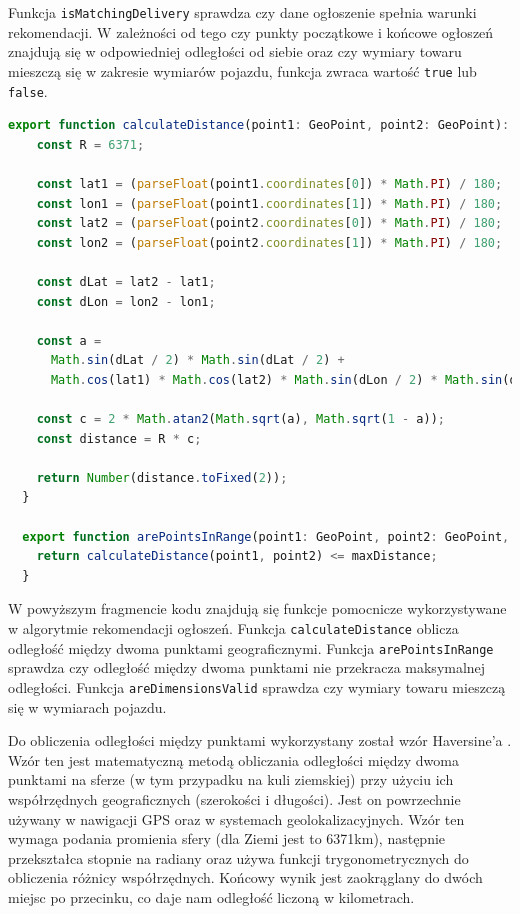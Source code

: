 Funkcja \texttt{isMatchingDelivery} sprawdza czy dane ogłoszenie spełnia warunki rekomendacji. W zależności od tego czy punkty początkowe i końcowe ogłoszeń znajdują się w odpowiedniej odległości od siebie oraz czy wymiary towaru mieszczą się w zakresie wymiarów pojazdu, funkcja zwraca wartość \texttt{true} lub \texttt{false}.

{\belowcaptionskip=-9pt
\begin{lstlisting}[language=JavaScript,caption=Funkcje obliczająca odległość między punktami, label=lst:calculateDistance]
  export function calculateDistance(point1: GeoPoint, point2: GeoPoint): number {
    const R = 6371;

    const lat1 = (parseFloat(point1.coordinates[0]) * Math.PI) / 180;
    const lon1 = (parseFloat(point1.coordinates[1]) * Math.PI) / 180;
    const lat2 = (parseFloat(point2.coordinates[0]) * Math.PI) / 180;
    const lon2 = (parseFloat(point2.coordinates[1]) * Math.PI) / 180;

    const dLat = lat2 - lat1;
    const dLon = lon2 - lon1;

    const a =
      Math.sin(dLat / 2) * Math.sin(dLat / 2) +
      Math.cos(lat1) * Math.cos(lat2) * Math.sin(dLon / 2) * Math.sin(dLon / 2);

    const c = 2 * Math.atan2(Math.sqrt(a), Math.sqrt(1 - a));
    const distance = R * c;

    return Number(distance.toFixed(2));
  }

  export function arePointsInRange(point1: GeoPoint, point2: GeoPoint, maxDistance: number): boolean {
    return calculateDistance(point1, point2) <= maxDistance;
  }
\end{lstlisting}
}

W powyższym fragmencie kodu znajdują się funkcje pomocnicze wykorzystywane w algorytmie rekomendacji ogłoszeń. Funkcja \texttt{calculateDistance} oblicza odległość między dwoma punktami geograficznymi. Funkcja \texttt{arePointsInRange} sprawdza czy odległość między dwoma punktami nie przekracza maksymalnej odległości. Funkcja \texttt{areDimensionsValid} sprawdza czy wymiary towaru mieszczą się w wymiarach pojazdu.

Do obliczenia odległości między punktami wykorzystany został wzór Haversine'a \cite{HeavenlyMathematics}. Wzór ten jest matematyczną metodą obliczania odległości między dwoma punktami na sferze (w tym przypadku na kuli ziemskiej) przy użyciu ich współrzędnych geograficznych (szerokości i długości). Jest on powrzechnie używany w nawigacji GPS oraz w systemach geolokalizacyjnych. Wzór ten wymaga podania promienia sfery (dla Ziemi jest to 6371km), następnie przekształca stopnie na radiany oraz używa funkcji trygonometrycznych do obliczenia różnicy współrzędnych. Końcowy wynik jest zaokrąglany do dwóch miejsc po przecinku, co daje nam odległość liczoną w kilometrach.

